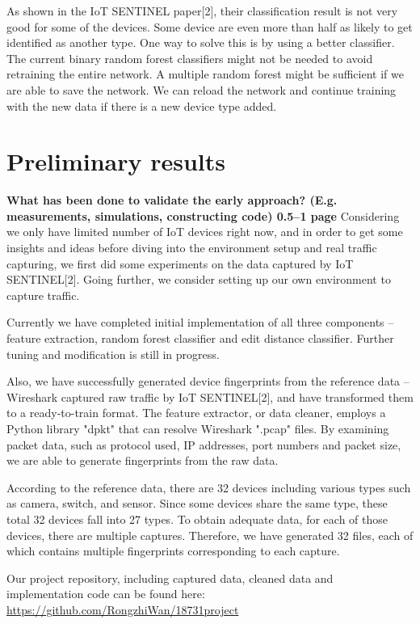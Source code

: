 \documentclass[twocolumn,10pt]{article}
\begin{document}
As shown in the IoT SENTINEL paper[2], their classification result is not very good for some of the devices. Some device are even more than half as likely to get identified as another type. One way to solve this is by using a better classifier. The current binary random forest classifiers might not be needed to avoid retraining the entire network. A multiple random forest might be sufficient if we are able to save the network. We can reload the network and continue training with the new data if there is a new device type added. 

\section{Preliminary results}

{\bf What has been done to validate the early approach? (E.g.
measurements, simulations, constructing code)  0.5--1 page}
Considering we only have limited number of IoT devices right now, and in order to get some insights and ideas before diving into the environment setup and real traffic capturing, we first did some experiments on the data captured by IoT SENTINEL[2]. Going further, we consider setting up our own environment to capture traffic. 

Currently we have completed initial implementation of all three components -- feature extraction, random forest classifier and edit distance classifier. Further tuning and modification is still in progress. 

Also, we have successfully generated device fingerprints from the reference data -- Wireshark captured raw traffic by IoT SENTINEL[2], and have transformed them to a ready-to-train format. The feature extractor, or data cleaner, employs a Python library "dpkt" that can resolve Wireshark ".pcap" files. By examining packet data, such as protocol used, IP addresses, port numbers and packet size, we are able to generate fingerprints from the raw data.

According to the reference data, there are 32 devices including various types such as camera, switch, and sensor. Since some devices share the same type, these total 32 devices fall into 27 types. To obtain adequate data, for each of those devices, there are multiple captures. Therefore, we have generated 32 files, each of which contains multiple fingerprints corresponding to each capture.

Our project repository, including captured data, cleaned data and implementation code can be found here:  
\url{https://github.com/RongzhiWan/18731project}
\end{document}
